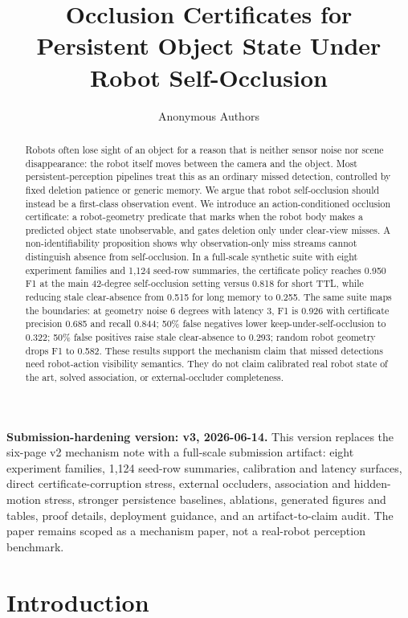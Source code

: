 \documentclass{article}
\title{Occlusion Certificates for Persistent Object State Under Robot Self-Occlusion}
\author{Anonymous Authors}
\begin{document}
\maketitle

\noindent\textbf{Submission-hardening version: v3, 2026-06-14.}
This version replaces the six-page v2 mechanism note with a full-scale
submission artifact: eight experiment families, 1,124 seed-row summaries,
calibration and latency surfaces, direct certificate-corruption stress, external
occluders, association and hidden-motion stress, stronger persistence baselines,
ablations, generated figures and tables, proof details, deployment guidance,
and an artifact-to-claim audit. The paper remains scoped as a mechanism paper,
not a real-robot perception benchmark.

\begin{abstract}
Robots often lose sight of an object for a reason that is neither sensor noise
nor scene disappearance: the robot itself moves between the camera and the
object. Most persistent-perception pipelines treat this as an ordinary missed
detection, controlled by fixed deletion patience or generic memory. We argue
that robot self-occlusion should instead be a first-class observation event. We
introduce an action-conditioned occlusion certificate: a robot-geometry predicate
that marks when the robot body makes a predicted object state unobservable, and
gates deletion only under clear-view misses. A non-identifiability proposition
shows why observation-only miss streams cannot distinguish absence from
self-occlusion. In a full-scale synthetic suite with eight experiment families
and 1,124 seed-row summaries, the certificate policy reaches 0.950 F1 at the
main 42-degree self-occlusion setting versus 0.818 for short TTL, while reducing
stale clear-absence from 0.515 for long memory to 0.255. The same suite maps the
boundaries: at geometry noise 6 degrees with latency 3, F1 is 0.926 with
certificate precision 0.685 and recall 0.844; 50\% false negatives lower
keep-under-self-occlusion to 0.322; 50\% false positives raise stale
clear-absence to 0.293; random robot geometry drops F1 to 0.582. These results
support the mechanism claim that missed detections need robot-action visibility
semantics. They do not claim calibrated real robot state of the art, solved
association, or external-occluder completeness.
\end{abstract}

\section{Introduction}
\end{document}
